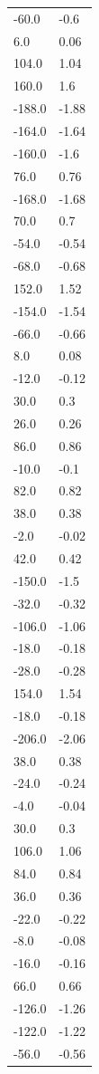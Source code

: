 \begin{longtable}{ll}
-60.0 & -0.6 \\
6.0 & 0.06 \\
104.0 & 1.04 \\
160.0 & 1.6 \\
-188.0 & -1.88 \\
-164.0 & -1.64 \\
-160.0 & -1.6 \\
76.0 & 0.76 \\
-168.0 & -1.68 \\
70.0 & 0.7 \\
-54.0 & -0.54 \\
-68.0 & -0.68 \\
152.0 & 1.52 \\
-154.0 & -1.54 \\
-66.0 & -0.66 \\
8.0 & 0.08 \\
-12.0 & -0.12 \\
30.0 & 0.3 \\
26.0 & 0.26 \\
86.0 & 0.86 \\
-10.0 & -0.1 \\
82.0 & 0.82 \\
38.0 & 0.38 \\
-2.0 & -0.02 \\
42.0 & 0.42 \\
-150.0 & -1.5 \\
-32.0 & -0.32 \\
-106.0 & -1.06 \\
-18.0 & -0.18 \\
-28.0 & -0.28 \\
154.0 & 1.54 \\
-18.0 & -0.18 \\
-206.0 & -2.06 \\
38.0 & 0.38 \\
-24.0 & -0.24 \\
-4.0 & -0.04 \\
30.0 & 0.3 \\
106.0 & 1.06 \\
84.0 & 0.84 \\
36.0 & 0.36 \\
-22.0 & -0.22 \\
-8.0 & -0.08 \\
-16.0 & -0.16 \\
66.0 & 0.66 \\
-126.0 & -1.26 \\
-122.0 & -1.22 \\
-56.0 & -0.56 \\

\end{longtable}
